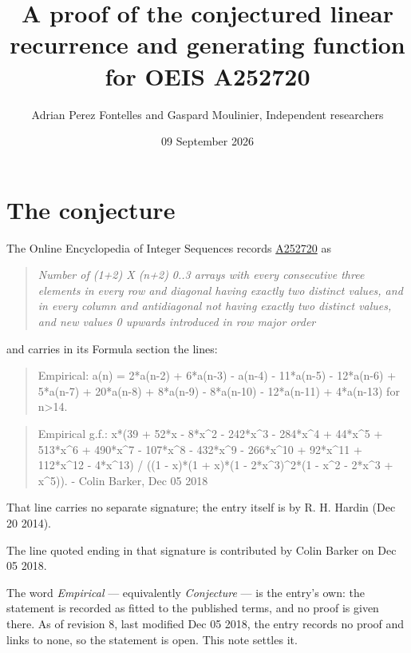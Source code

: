 \documentclass[11pt]{article}
\title{A proof of the conjectured linear recurrence and generating function for OEIS A252720}
\author{Adrian Perez Fontelles and Gaspard Moulinier, Independent researchers}
\date{09 September 2026}
\theoremstyle{definition}
\begin{document}
\maketitle
\section{The conjecture}

The Online Encyclopedia of Integer Sequences records \href{https://oeis.org/A252720}{A252720} as

\begin{quote}\itshape Number of (1+2) X (n+2) 0..3 arrays with every consecutive three elements in every row and diagonal having exactly two distinct values, and in every column and antidiagonal not having exactly two distinct values, and new values 0 upwards introduced in row major order\end{quote}

and carries in its Formula section the lines:

\begin{quote}\ttfamily Empirical: a(n) = 2*a(n-2) + 6*a(n-3) - a(n-4) - 11*a(n-5) - 12*a(n-6) + 5*a(n-7) + 20*a(n-8) + 8*a(n-9) - 8*a(n-10) - 12*a(n-11) + 4*a(n-13) for n>14.\end{quote}

\begin{quote}\ttfamily Empirical g.f.: x*(39 + 52*x - 8*x\textasciicircum{}2 - 242*x\textasciicircum{}3 - 284*x\textasciicircum{}4 + 44*x\textasciicircum{}5 + 513*x\textasciicircum{}6 + 490*x\textasciicircum{}7 - 107*x\textasciicircum{}8 - 432*x\textasciicircum{}9 - 266*x\textasciicircum{}10 + 92*x\textasciicircum{}11 + 112*x\textasciicircum{}12 - 4*x\textasciicircum{}13) / ((1 - x)*(1 + x)*(1 - 2*x\textasciicircum{}3)\textasciicircum{}2*(1 - x\textasciicircum{}2 - 2*x\textasciicircum{}3 + x\textasciicircum{}5)). - Colin Barker, Dec 05 2018\end{quote}

That line carries no separate signature; the entry itself is by R. H. Hardin (Dec 20 2014).

The line quoted ending in that signature is contributed by Colin Barker on Dec 05 2018.

The word {\itshape Empirical} --- equivalently {\itshape Conjecture} --- is the entry's own: the statement is recorded as fitted to the published terms, and no proof is given there. As of revision 8, last modified Dec 05 2018, the entry records no proof and links to none, so the statement is open. This note settles it.
\end{document}
